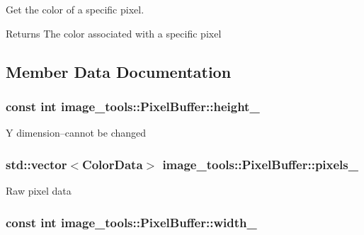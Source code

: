 Get the color of a specific pixel. 

\begin{DoxyReturn}{Returns}
The color associated with a specific pixel 
\end{DoxyReturn}


\subsection{Member Data Documentation}
\subsubsection[{\texorpdfstring{height\+\_\+}{height_}}]{\setlength{\rightskip}{0pt plus 5cm}const int image\+\_\+tools\+::\+Pixel\+Buffer\+::height\+\_\+\hspace{0.3cm}{\ttfamily [private]}}\hypertarget{classimage__tools_1_1PixelBuffer_ae104466eae109324a4a0daa0bc14c980}{}\label{classimage__tools_1_1PixelBuffer_ae104466eae109324a4a0daa0bc14c980}
Y dimension--cannot be changed 
\subsubsection[{\texorpdfstring{pixels\+\_\+}{pixels_}}]{\setlength{\rightskip}{0pt plus 5cm}std\+::vector$<${\bf Color\+Data}$>$ image\+\_\+tools\+::\+Pixel\+Buffer\+::pixels\+\_\+\hspace{0.3cm}{\ttfamily [private]}}\hypertarget{classimage__tools_1_1PixelBuffer_a0c52483e7e29f111acf98474105f2409}{}\label{classimage__tools_1_1PixelBuffer_a0c52483e7e29f111acf98474105f2409}
Raw pixel data 
\subsubsection[{\texorpdfstring{width\+\_\+}{width_}}]{\setlength{\rightskip}{0pt plus 5cm}const int image\+\_\+tools\+::\+Pixel\+Buffer\+::width\+\_\+\hspace{0.3cm}{\ttfamily [private]}}\hypertarget{classimage__tools_1_1PixelBuffer_ac67206a6b428c7b33bd7f90f65b8c171}{}\label{classimage__tools_1_1PixelBuffer_ac67206a6b428c7b33bd7f90f65b8c171}


